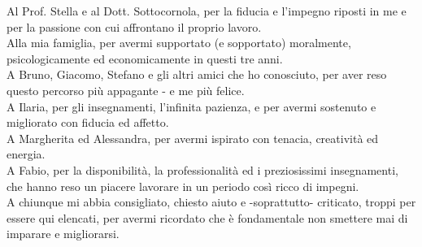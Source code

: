 \cleardoublepage
\begingroup
\let\clearpage\endgroup
\null{}

\begin{flushright}
\begin{minipage}{5.3in}
\begin{flushright}
\begin{em}
Al Prof. Stella e al Dott. Sottocornola,
per la fiducia e l'impegno riposti in me e per la passione con cui affrontano il proprio lavoro.
\\
Alla mia famiglia,
per avermi supportato (e sopportato) moralmente, psicologicamente ed economicamente in questi tre anni.
\\
A Bruno, Giacomo, Stefano e gli altri amici che ho conosciuto, 
per aver reso questo percorso più appagante - e me più felice.
\\
A Ilaria, 
per gli insegnamenti, l'infinita pazienza, e per avermi sostenuto e migliorato con fiducia ed affetto.
\\
A Margherita ed Alessandra, 
per avermi ispirato con tenacia, creatività ed energia.
\\
A Fabio, 
per la disponibilità, la professionalità ed i preziosissimi insegnamenti, che hanno reso un piacere lavorare in un periodo così ricco di impegni.
\\
A chiunque mi abbia consigliato, chiesto aiuto e -soprattutto- criticato, troppi per essere qui elencati, per avermi ricordato che è fondamentale non smettere mai di imparare e migliorarsi.

\end{em}
\end{flushright}
\end{minipage}
\end{flushright}
 \null
